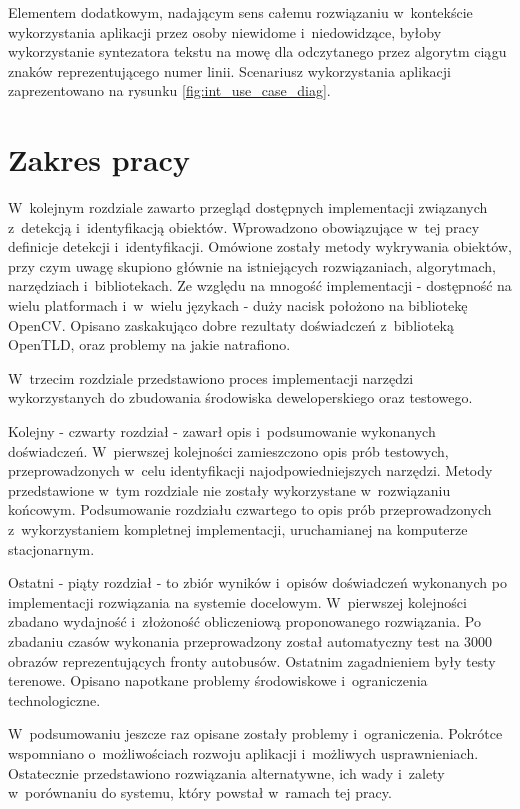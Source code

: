 Elementem dodatkowym, nadającym sens całemu rozwiązaniu w~kontekście
wykorzystania aplikacji przez osoby niewidome i~niedowidzące,
byłoby wykorzystanie syntezatora tekstu na mowę dla 
odczytanego przez algorytm ciągu znaków reprezentującego numer linii. 
Scenariusz wykorzystania aplikacji zaprezentowano na rysunku
\ref{fig:int_use_case_diag}.


\section{Zakres pracy}

W~kolejnym rozdziale zawarto przegląd dostępnych implementacji związanych
z~detekcją i~identyfikacją obiektów. Wprowadzono obowiązujące
w~tej pracy definicje detekcji i~identyfikacji. 
Omówione zostały metody wykrywania obiektów, przy czym uwagę skupiono
głównie na istniejących rozwiązaniach, algorytmach, narzędziach 
i~bibliotekach. Ze względu na mnogość implementacji - dostępność 
na wielu platformach i~w~wielu językach - duży nacisk położono 
na bibliotekę OpenCV. Opisano zaskakująco dobre
rezultaty doświadczeń z~biblioteką OpenTLD, oraz problemy
na jakie natrafiono.

W~trzecim rozdziale przedstawiono proces implementacji
narzędzi wykorzystanych do zbudowania środowiska deweloperskiego
oraz testowego.

Kolejny - czwarty rozdział - zawarł opis i~podsumowanie wykonanych doświadczeń.
W~pierwszej kolejności zamieszczono opis 
prób testowych, przeprowadzonych w~celu identyfikacji najodpowiedniejszych 
narzędzi. Metody przedstawione 
w~tym rozdziale nie zostały wykorzystane w~rozwiązaniu końcowym.
Podsumowanie rozdziału czwartego to opis prób przeprowadzonych z~wykorzystaniem
kompletnej
implementacji, uruchamianej na komputerze stacjonarnym.

Ostatni - piąty rozdział - to zbiór wyników i~opisów doświadczeń 
wykonanych po implementacji rozwiązania na 
systemie docelowym. W~pierwszej kolejności
zbadano wydajność i~złożoność obliczeniową proponowanego rozwiązania.
Po zbadaniu czasów wykonania przeprowadzony został automatyczny test na 3000 obrazów
reprezentujących fronty autobusów. Ostatnim zagadnieniem były testy terenowe.
Opisano napotkane problemy środowiskowe i~ograniczenia technologiczne.

W~podsumowaniu jeszcze raz opisane zostały problemy i~ograniczenia.
Pokrótce wspomniano o~możliwościach rozwoju aplikacji i~możliwych usprawnieniach.
Ostatecznie przedstawiono rozwiązania alternatywne, ich wady i~zalety
w~porównaniu do systemu, który powstał w~ramach tej pracy.
